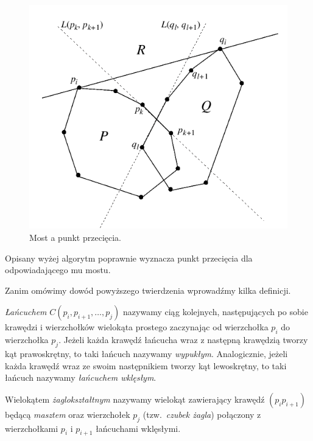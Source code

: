 \begin{figure}[htb]
  \centering
  \includegraphics[scale=0.7]{img/toussaint2}
  \caption{\label{img:toussaint2} Most a punkt przecięcia.}
\end{figure}

\begin{twierdzenie}
  Opisany wyżej algorytm poprawnie wyznacza punkt przecięcia dla
  odpowiadającego mu mostu.
\end{twierdzenie}

Zanim omówimy dowód powyższego twierdzenia wprowadźmy kilka definicji.

\begin{definicja}
  \emph{Łańcuchem} $C(p_i,p_{i+1},\ldots,p_j)$ nazywamy ciąg
  kolejnych, następujących po sobie krawędzi i wierzchołków wielokąta
  prostego zaczynając od wierzchołka $p_i$ do wierzchołka
  $p_j$. Jeżeli każda krawędź łańcucha wraz z następną krawędzią
  tworzy kąt prawoskrętny, to taki łańcuch nazywamy
  \emph{wypukłym}. Analogicznie, jeżeli każda krawędź wraz ze swoim
  następnikiem tworzy kąt lewoskrętny, to taki łańcuch nazywamy
  \emph{łańcuchem wklęsłym}.
\end{definicja}

\begin{definicja}
  Wielokątem \emph{żaglokształtnym} nazywamy wielokąt zawierający
  krawędź $(p_{i}p_{i+1})$ będącą \emph{masztem} oraz wierzchołek
  $p_j$ (tzw.\ \emph{czubek żagla}) połączony z wierzchołkami $p_i$ i
  $p_{i+1}$ łańcuchami wklęsłymi.
\end{definicja}

